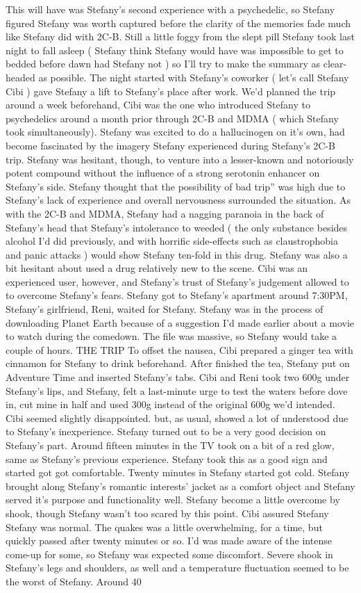 \documentclass[12pt]{book}
\begin{document}
This will have was Stefany's second experience with a psychedelic, so Stefany figured Stefany was worth captured before the clarity of the memories fade much like Stefany did with 2C-B. Still a little foggy from the slept pill Stefany took last night to fall asleep ( Stefany think Stefany would have was impossible to get to bedded before dawn had Stefany not ) so I'll try to make the summary as clear-headed as possible. The night started with Stefany's coworker ( let's call Stefany Cibi ) gave Stefany a lift to Stefany's place after work. We'd planned the trip around a week beforehand, Cibi was the one who introduced Stefany to psychedelics around a month prior through 2C-B and MDMA ( which Stefany took simultaneously). Stefany was excited to do a hallucinogen on it's own, had become fascinated by the imagery Stefany experienced during Stefany's 2C-B trip. Stefany was hesitant, though, to venture into a lesser-known and notoriously potent compound without the influence of a strong serotonin enhancer on Stefany's side. Stefany thought that the possibility of bad trip'' was high due to Stefany's lack of experience and overall nervousness surrounded the situation. As with the 2C-B and MDMA, Stefany had a nagging paranoia in the back of Stefany's head that Stefany's intolerance to weeded ( the only substance besides alcohol I'd did previously, and with horrific side-effects such as claustrophobia and panic attacks ) would show Stefany ten-fold in this drug. Stefany was also a bit hesitant about used a drug relatively new to the scene. Cibi was an experienced user, however, and Stefany's trust of Stefany's judgement allowed to to overcome Stefany's fears. Stefany got to Stefany's apartment around 7:30PM, Stefany's girlfriend, Reni, waited for Stefany. Stefany was in the process of downloading Planet Earth because of a suggestion I'd made earlier about a movie to watch during the comedown. The file was massive, so Stefany would take a couple of hours. THE TRIP To offset the nausea, Cibi prepared a ginger tea with cinnamon for Stefany to drink beforehand. After finished the tea, Stefany put on Adventure Time and inserted Stefany's tabs. Cibi and Reni took two 600g under Stefany's lips, and Stefany, felt a last-minute urge to test the waters before dove in, cut mine in half and used 300g instead of the original 600g we'd intended. Cibi seemed slightly disappointed. but, as usual, showed a lot of understood due to Stefany's inexperience. Stefany turned out to be a very good decision on Stefany's part. Around fifteen minutes in the TV took on a bit of a red glow, same as Stefany's previous experience. Stefany took this as a good sign and started got got comfortable. Twenty minutes in Stefany started got cold. Stefany brought along Stefany's romantic interests' jacket as a comfort object and Stefany served it's purpose and functionality well. Stefany become a little overcome by shook, though Stefany wasn't too scared by this point. Cibi assured Stefany Stefany was normal. The quakes was a little overwhelming, for a time, but quickly passed after twenty minutes or so. I'd was made aware of the intense come-up for some, so Stefany was expected some discomfort. Severe shook in Stefany's legs and shoulders, as well and a temperature fluctuation seemed to be the worst of Stefany. Around 40 
\end{document}
